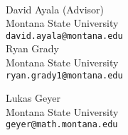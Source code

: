 \documentclass[10pt,letter]{moderncv}
\begin{document}
\begin{minipage}[t]{0.16\textwidth}
\
\end{minipage}
\begin{minipage}[t]{0.42\textwidth}


David Ayala (Advisor) \\
Montana State University \\
\texttt{david.ayala@montana.edu} \\


Ryan Grady  \\
Montana State University \\
\texttt{ryan.grady1@montana.edu} \\


\end{minipage}
\begin{minipage}[t]{0.42\textwidth}
Lukas Geyer\\
Montana State University\\
\texttt{geyer@math.montana.edu}


\end{minipage}
\end{document}
